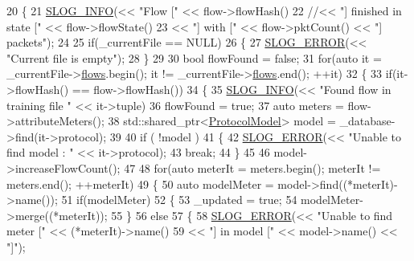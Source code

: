 \begin{DoxyCode}
20 \{
21     \hyperlink{_logger_8h_a119c1c29ba35a8db38e2358e41167282}{SLOG\_INFO}(<< \textcolor{stringliteral}{"Flow ["} << flow->flowHash() 
22                     \textcolor{comment}{//<< "] finished in state [" << flow->flowState() }
23                     << \textcolor{stringliteral}{"] with ["} << flow->pktCount() << \textcolor{stringliteral}{"] packets"});
24 
25     \textcolor{keywordflow}{if}(\_currentFile == NULL)
26     \{
27         \hyperlink{_logger_8h_a2a8694cd392d18f4db6b9cc9f15bafe3}{SLOG\_ERROR}(<< \textcolor{stringliteral}{"Current file is empty"});
28     \}
29 
30     \textcolor{keywordtype}{bool} flowFound = \textcolor{keyword}{false};
31     \textcolor{keywordflow}{for}(\textcolor{keyword}{auto} it = \_currentFile->\hyperlink{class_vsid_training_1_1_training_file_aaaa833a3a302e0abe9bd081abd4b7867}{flows}.begin(); it != \_currentFile->\hyperlink{class_vsid_training_1_1_training_file_aaaa833a3a302e0abe9bd081abd4b7867}{flows}.end(); ++it)
32     \{
33         \textcolor{keywordflow}{if}(it->flowHash() == flow->flowHash())
34         \{
35             \hyperlink{_logger_8h_a119c1c29ba35a8db38e2358e41167282}{SLOG\_INFO}(<< \textcolor{stringliteral}{"Found flow in training file "} << it->tuple)
36             flowFound = true;
37             auto meters = flow->attributeMeters();
38             std::shared\_ptr<\hyperlink{class_vsid_1_1_protocol_model}{ProtocolModel}> model = \_database->find(it->protocol);
39 
40             if ( !model )
41             \{
42                 \hyperlink{_logger_8h_a2a8694cd392d18f4db6b9cc9f15bafe3}{SLOG\_ERROR}(<< \textcolor{stringliteral}{"Unable to find model : "} << it->protocol);
43                 \textcolor{keywordflow}{break};
44             \}
45 
46             model->increaseFlowCount();
47             
48             \textcolor{keywordflow}{for}(\textcolor{keyword}{auto} meterIt = meters.begin(); meterIt != meters.end(); ++meterIt)
49             \{
50                 \textcolor{keyword}{auto} modelMeter = model->find((*meterIt)->name());
51                 \textcolor{keywordflow}{if}(modelMeter)
52                 \{
53                     \_updated = \textcolor{keyword}{true};
54                     modelMeter->merge((*meterIt));
55                 \}
56                 \textcolor{keywordflow}{else}
57                 \{
58                     \hyperlink{_logger_8h_a2a8694cd392d18f4db6b9cc9f15bafe3}{SLOG\_ERROR}(<< \textcolor{stringliteral}{"Unable to find meter ["} << (*meterIt)->name() 
59                                     << \textcolor{stringliteral}{"] in model ["} << model->name() << \textcolor{stringliteral}{"]"});

\end{DoxyCode}
